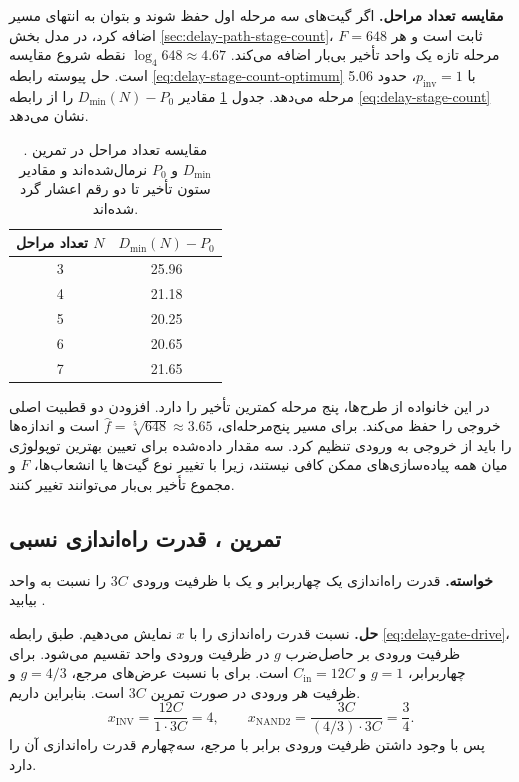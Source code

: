 \textbf{مقایسه تعداد مراحل.}
اگر گیت‌های سه مرحله اول حفظ شوند و بتوان به انتهای مسیر
 اضافه کرد،
در مدل بخش \ref{sec:delay-path-stage-count}، \(F=648\) ثابت است و
هر مرحله تازه یک واحد تأخیر بی‌بار اضافه می‌کند.
\(\log_4 648\approx4.67\) نقطه شروع مقایسه است.
حل پیوسته رابطه \eqref{eq:delay-stage-count-optimum} با \(p_{\mathrm{inv}}=1\)، حدود \num{5.06} مرحله می‌دهد.
جدول \ref{tab:delay-exercise-stage-count} مقادیر
\(D_{\min}(N)-P_0\) را از
رابطه \eqref{eq:delay-stage-count} نشان می‌دهد.

\begin{table}[htbp]
  \centering
  \caption{مقایسه تعداد مراحل در تمرین .
  \(D_{\min}\) و \(P_0\) نرمال‌شده‌اند و مقادیر ستون تأخیر
  تا دو رقم اعشار گرد شده‌اند.}
  \label{tab:delay-exercise-stage-count}
  \begin{tabular}{cc}
    \toprule
    تعداد مراحل \(N\) & \(D_{\min}(N)-P_0\) \\
    \midrule
    \num{3} & \num{25.96} \\
    \num{4} & \num{21.18} \\
    \num{5} & \num{20.25} \\
    \num{6} & \num{20.65} \\
    \num{7} & \num{21.65} \\
    \bottomrule
  \end{tabular}
\end{table}

در این خانواده از طرح‌ها، پنج مرحله کمترین تأخیر را دارد.
افزودن دو  قطبیت اصلی خروجی را حفظ می‌کند.
برای مسیر پنج‌مرحله‌ای، \(\widehat f=\sqrt[5]{648}\approx3.65\)
است و اندازه‌ها را باید از خروجی به ورودی تنظیم کرد.
سه مقدار داده‌شده برای تعیین بهترین توپولوژی میان همه پیاده‌سازی‌های
ممکن کافی نیستند، زیرا با تغییر نوع گیت‌ها یا انشعاب‌ها،
\(F\) و مجموع تأخیر بی‌بار می‌توانند تغییر کنند.

\subsection{تمرین ، قدرت راه‌اندازی نسبی}
\label{sec:delay-exercise-drive}

\textbf{خواسته.}
قدرت راه‌اندازی یک  چهاربرابر و یک
 با ظرفیت ورودی \(3C\) را نسبت به
 واحد بیابید
\cite[تمرین ، صفحه ۱۷۷]{weste}.

\textbf{حل.}
نسبت قدرت راه‌اندازی را با \(x\) نمایش می‌دهیم.
طبق رابطه \eqref{eq:delay-gate-drive}، ظرفیت ورودی بر حاصل‌ضرب \(g\)
در ظرفیت ورودی  واحد تقسیم می‌شود. برای
 چهاربرابر، \(g=1\) و \(C_{\mathrm{in}}=12C\)
است. برای  با نسبت عرض‌های مرجع، \(g=4/3\)
و ظرفیت هر ورودی در صورت تمرین \(3C\) است. بنابراین داریم.
\[
  x_{\mathrm{INV}}=\frac{12C}{1\cdot3C}=4,
  \qquad
  x_{\mathrm{NAND2}}=\frac{3C}{(4/3)\cdot3C}=\frac34.
\]
پس  با وجود داشتن ظرفیت ورودی برابر با مرجع،
سه‌چهارم قدرت راه‌اندازی آن را دارد.


